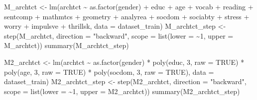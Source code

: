\documentclass[
]{article}
\newenvironment{Shaded}{\begin{snugshade}}{\end{snugshade}}
\newcommand{\AttributeTok}[1]{\textcolor[rgb]{0.77,0.63,0.00}{#1}}
\newcommand{\ConstantTok}[1]{\textcolor[rgb]{0.00,0.00,0.00}{#1}}
\newcommand{\DecValTok}[1]{\textcolor[rgb]{0.00,0.00,0.81}{#1}}
\newcommand{\FunctionTok}[1]{\textcolor[rgb]{0.00,0.00,0.00}{#1}}
\newcommand{\NormalTok}[1]{#1}
\newcommand{\OtherTok}[1]{\textcolor[rgb]{0.56,0.35,0.01}{#1}}
\newcommand{\SpecialCharTok}[1]{\textcolor[rgb]{0.00,0.00,0.00}{#1}}
\newcommand{\StringTok}[1]{\textcolor[rgb]{0.31,0.60,0.02}{#1}}
\begin{document}
\begin{Shaded}
\begin{Highlighting}[]
\NormalTok{M\_archtct }\OtherTok{\textless{}{-}} \FunctionTok{lm}\NormalTok{(archtct }\SpecialCharTok{\textasciitilde{}} \FunctionTok{as.factor}\NormalTok{(gender) }\SpecialCharTok{+}\NormalTok{ educ }\SpecialCharTok{+}\NormalTok{ age }\SpecialCharTok{+}\NormalTok{ vocab }\SpecialCharTok{+}
\NormalTok{    reading }\SpecialCharTok{+}\NormalTok{ sentcomp }\SpecialCharTok{+}\NormalTok{ mathmtcs }\SpecialCharTok{+}\NormalTok{ geometry }\SpecialCharTok{+}\NormalTok{ analyrea }\SpecialCharTok{+}\NormalTok{ socdom }\SpecialCharTok{+}
\NormalTok{    sociabty }\SpecialCharTok{+}\NormalTok{ stress }\SpecialCharTok{+}\NormalTok{ worry }\SpecialCharTok{+}\NormalTok{ impulsve }\SpecialCharTok{+}\NormalTok{ thrillsk, }\AttributeTok{data =}\NormalTok{ dataset\_train)}
\NormalTok{M\_archtct\_step }\OtherTok{\textless{}{-}} \FunctionTok{step}\NormalTok{(M\_archtct, }\AttributeTok{direction =} \StringTok{"backward"}\NormalTok{, }\AttributeTok{scope =} \FunctionTok{list}\NormalTok{(}\AttributeTok{lower =} \SpecialCharTok{\textasciitilde{}}\DecValTok{1}\NormalTok{,}
    \AttributeTok{upper =}\NormalTok{ M\_archtct))}
\FunctionTok{summary}\NormalTok{(M\_archtct\_step)}
\end{Highlighting}
\end{Shaded}

\begin{Shaded}
\begin{Highlighting}[]
\NormalTok{M2\_archtct }\OtherTok{\textless{}{-}} \FunctionTok{lm}\NormalTok{(archtct }\SpecialCharTok{\textasciitilde{}} \FunctionTok{as.factor}\NormalTok{(gender) }\SpecialCharTok{*} \FunctionTok{poly}\NormalTok{(educ, }\DecValTok{3}\NormalTok{,}
    \AttributeTok{raw =} \ConstantTok{TRUE}\NormalTok{) }\SpecialCharTok{*} \FunctionTok{poly}\NormalTok{(age, }\DecValTok{3}\NormalTok{, }\AttributeTok{raw =} \ConstantTok{TRUE}\NormalTok{) }\SpecialCharTok{*} \FunctionTok{poly}\NormalTok{(socdom, }\DecValTok{3}\NormalTok{,}
    \AttributeTok{raw =} \ConstantTok{TRUE}\NormalTok{), }\AttributeTok{data =}\NormalTok{ dataset\_train)}
\NormalTok{M2\_archtct\_step }\OtherTok{\textless{}{-}} \FunctionTok{step}\NormalTok{(M2\_archtct, }\AttributeTok{direction =} \StringTok{"backward"}\NormalTok{, }\AttributeTok{scope =} \FunctionTok{list}\NormalTok{(}\AttributeTok{lower =} \SpecialCharTok{\textasciitilde{}}\DecValTok{1}\NormalTok{,}
    \AttributeTok{upper =}\NormalTok{ M2\_archtct))}
\FunctionTok{summary}\NormalTok{(M2\_archtct\_step)}
\end{Highlighting}
\end{Shaded}
\end{document}
